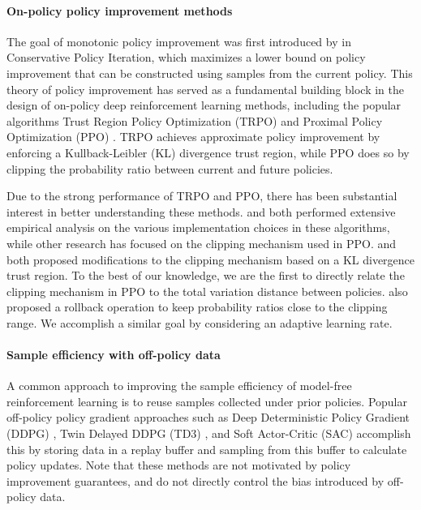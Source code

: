 \documentclass{article}
\begin{document}
\paragraph{On-policy policy improvement methods}

The goal of monotonic policy improvement was first introduced by \citet{kakade_2002} in Conservative Policy Iteration, which maximizes a lower bound on policy improvement that can be constructed using samples from the current policy. This theory of policy improvement has served as a fundamental building block in the design of on-policy deep reinforcement learning methods, including the popular algorithms Trust Region Policy Optimization (TRPO) \citep{schulman_2015} and Proximal Policy Optimization (PPO) \citep{schulman_2017}. TRPO achieves approximate policy improvement by enforcing a Kullback-Leibler (KL) divergence trust region, while PPO does so by clipping the probability ratio between current and future policies.

Due to the strong performance of TRPO and PPO, there has been substantial interest in better understanding these methods. \citet{engstrom_2020} and \citet{andrychowicz_2021} both performed extensive empirical analysis on the various implementation choices in these algorithms, while other research has focused on the clipping mechanism used in PPO. \citet{wang_2019} and \citet{wang_2020} both proposed modifications to the clipping mechanism based on a KL divergence trust region. To the best of our knowledge, we are the first to directly relate the clipping mechanism in PPO to the total variation distance between policies. \citet{wang_2020} also proposed a rollback operation to keep probability ratios close to the clipping range. We accomplish a similar goal by considering an adaptive learning rate.

\paragraph{Sample efficiency with off-policy data}

A common approach to improving the sample efficiency of model-free reinforcement learning is to reuse samples collected under prior policies. Popular off-policy policy gradient approaches such as Deep Deterministic Policy Gradient (DDPG) \citep{lillicrap_2016}, Twin Delayed DDPG (TD3) \citep{fujimoto_2018}, and Soft Actor-Critic (SAC) \citep{haarnoja_2018} accomplish this by storing data in a replay buffer and sampling from this buffer to calculate policy updates. Note that these methods are not motivated by policy improvement guarantees, and do not directly control the bias introduced by off-policy data.
\end{document}
